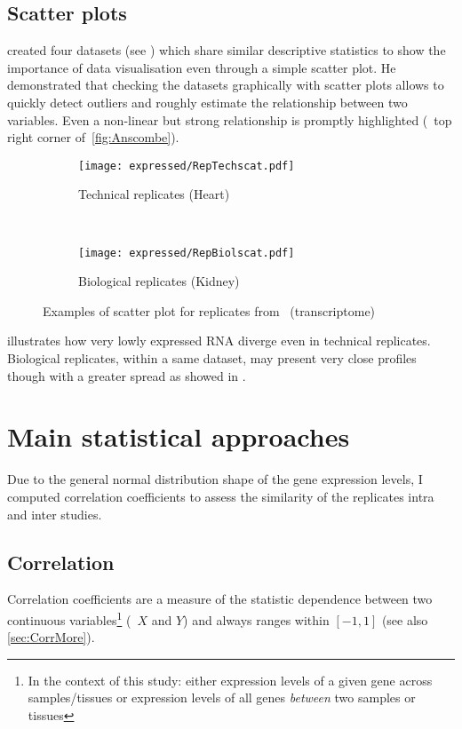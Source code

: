 \subsection{Scatter plots}

\cite{anscombe} created four datasets (see )
which share similar descriptive statistics to show the importance
of data visualisation even through a simple scatter plot.
He demonstrated that checking the datasets graphically with scatter plots
allows to quickly detect outliers and roughly estimate
the relationship between two variables.
Even a non-linear but strong relationship is promptly highlighted
(\eg\ top right corner of~\cref{fig:Anscombe}).

\begin{figure}
    \centering
    \begin{subfigure}[b]{0.45\textwidth}
        \centering \texttt{[image: expressed/RepTechscat.pdf]}
        \caption{Technical replicates (Heart)}\label{fig:scatTechRep}
    \end{subfigure}~%
    \begin{subfigure}[b]{0.45\textwidth}
    \centering \texttt{[image: expressed/RepBiolscat.pdf]}
        \caption{Biological replicates (Kidney)}\label{fig:scatBiolRep}
    \end{subfigure}
    \caption{Examples of scatter plot for replicates from \uhlen\
    (transcriptome)}\label{fig:scatEg}
\end{figure}

 illustrates how very lowly expressed \gls{RNA}
diverge even in technical replicates.
Biological replicates, within a same dataset,
may present very close profiles though with a greater spread
as showed in .


\section{Main statistical approaches}

Due to the general normal distribution shape of the gene expression levels,
I computed correlation coefficients to assess the similarity of the replicates
intra and inter studies.

\subsection{Correlation}

Correlation coefficients are a measure of the statistic dependence between two
continuous variables\footnote{In the context of this study: either expression
levels of a given gene across samples/tissues or expression levels of all genes
\emph{between} two samples or tissues} (\eg\
$X$ and $Y$) and always ranges within $[-1,1]$ (see also \cref{sec:CorrMore}).

